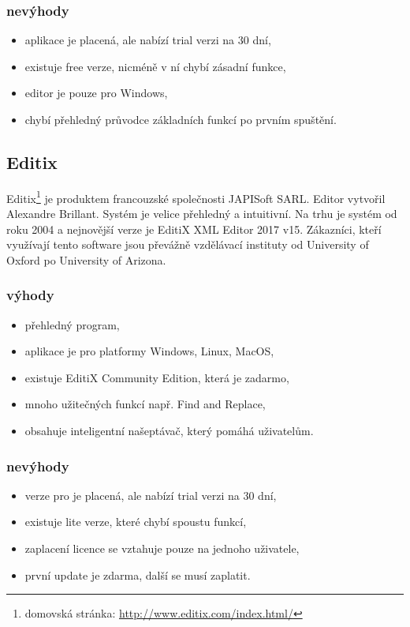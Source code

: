             \subsubsection{nevýhody}
                \begin{itemize}
                    \item aplikace je placená, ale nabízí trial verzi na 30 dní,
                    \item existuje free verze, nicméně v ní chybí zásadní funkce,
                    \item editor je pouze pro Windows,
                    \item chybí přehledný průvodce základních funkcí po prvním spuštění.
                \end{itemize}
                
        \subsection{Editix} 
            Editix\footnote{domovská stránka: \url{http://www.editix.com/index.html/}} je produktem francouzské společnosti JAPISoft SARL. Editor vytvořil Alexandre Brillant. Systém je velice přehledný a intuitivní. Na trhu je systém od roku 2004 a nejnovější verze je EditiX XML Editor 2017 v15. Zákazníci, kteří využívají tento software jsou převážně vzdělávací instituty od University of Oxford po University of Arizona.
            
            \subsubsection{výhody}
                \begin{itemize}
                    \item přehledný program,
                    \item aplikace je pro platformy Windows, Linux, MacOS,
                    \item existuje EditiX Community Edition, která je zadarmo,
                    \item mnoho užitečných funkcí např. Find and Replace,
                    \item obsahuje inteligentní našeptávač, který pomáhá uživatelům.
                \end{itemize}
                
            \subsubsection{nevýhody}
                \begin{itemize}
                    \item verze pro je placená, ale nabízí trial verzi na 30 dní,
                    \item existuje lite verze, které chybí spoustu funkcí,
                    \item zaplacení licence se vztahuje pouze na jednoho uživatele,
                    \item první update je zdarma, další se musí zaplatit.
                \end{itemize}
                
